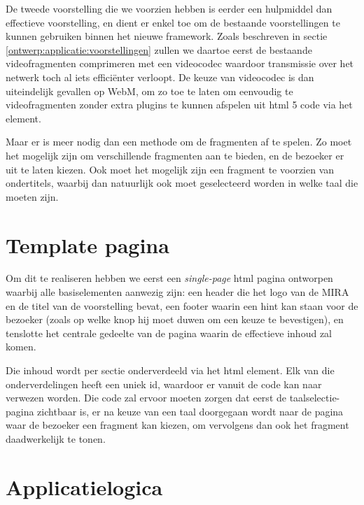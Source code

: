 De tweede voorstelling die we voorzien hebben is eerder een hulpmiddel dan effectieve voorstelling, en dient er enkel toe om de bestaande voorstellingen te kunnen gebruiken binnen het nieuwe framework. Zoals beschreven in sectie \ref{ontwerp:applicatie:voorstellingen} zullen we daartoe eerst de bestaande videofragmenten comprimeren met een videocodec waardoor transmissie over het netwerk toch al iets efficiënter verloopt. De keuze van videocodec is dan uiteindelijk gevallen op WebM, om zo toe te laten om eenvoudig te videofragmenten zonder extra plugins te kunnen afspelen uit \ac{html} 5 code via het  element.

Maar er is meer nodig dan een methode om de fragmenten af te spelen. Zo moet het mogelijk zijn om verschillende fragmenten aan te bieden, en de bezoeker er uit te laten kiezen. Ook moet het mogelijk zijn een fragment te voorzien van ondertitels, waarbij dan natuurlijk ook moet geselecteerd worden in welke taal die moeten zijn.

\section{Template pagina}

Om dit te realiseren hebben we eerst een \emph{single-page} \ac{html} pagina ontworpen waarbij alle basiselementen aanwezig zijn: een header die het logo van de MIRA en de titel van de voorstelling bevat, een footer waarin een hint kan staan voor de bezoeker (zoals op welke knop hij moet duwen om een keuze te bevestigen), en tenslotte het centrale gedeelte van de pagina waarin de effectieve inhoud zal komen.

Die inhoud wordt per sectie onderverdeeld via het \ac{html}  element. Elk van die onderverdelingen heeft een uniek id, waardoor er vanuit de code kan naar verwezen worden. Die code zal ervoor moeten zorgen dat eerst de taalselectie-pagina zichtbaar is, er na keuze van een taal doorgegaan wordt naar de pagina waar de bezoeker een fragment kan kiezen, om vervolgens dan ook het fragment daadwerkelijk te tonen.

\section{Applicatielogica}

